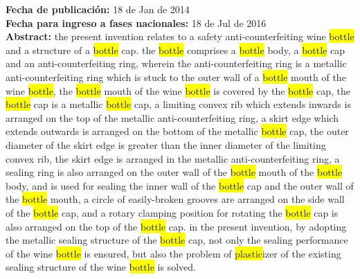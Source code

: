\textbf{Fecha de publicación:} 18 de Jan de 2014\\ 
\textbf{Fecha para ingreso a fases nacionales:} 18 de Jul de 2016\\ 
\textbf{Abstract:} the present invention relates to a safety anti-counterfeiting wine \colorbox{yellow}{bottle} and a structure of a \colorbox{yellow}{bottle} cap. the \colorbox{yellow}{bottle} comprises a \colorbox{yellow}{bottle} body, a \colorbox{yellow}{bottle} cap and an anti-counterfeiting ring, wherein the anti-counterfeiting ring is a metallic anti-counterfeiting ring which is stuck to the outer wall of a \colorbox{yellow}{bottle} mouth of the wine \colorbox{yellow}{bottle}, the \colorbox{yellow}{bottle} mouth of the wine \colorbox{yellow}{bottle} is covered by the \colorbox{yellow}{bottle} cap, the \colorbox{yellow}{bottle} cap is a metallic \colorbox{yellow}{bottle} cap, a limiting convex rib which extends inwards is arranged on the top of the metallic anti-counterfeiting ring, a skirt edge which extends outwards is arranged on the bottom of the metallic \colorbox{yellow}{bottle} cap, the outer diameter of the skirt edge is greater than the inner diameter of the limiting convex rib, the skirt edge is arranged in the metallic anti-counterfeiting ring, a sealing ring is also arranged on the outer wall of the \colorbox{yellow}{bottle} mouth of the \colorbox{yellow}{bottle} body, and is used for sealing the inner wall of the \colorbox{yellow}{bottle} cap and the outer wall of the \colorbox{yellow}{bottle} mouth, a circle of easily-broken grooves are arranged on the side wall of the \colorbox{yellow}{bottle} cap, and a rotary clamping position for rotating the \colorbox{yellow}{bottle} cap is also arranged on the top of the \colorbox{yellow}{bottle} cap. in the present invention, by adopting the metallic sealing structure of the \colorbox{yellow}{bottle} cap, not only the sealing performance of the wine \colorbox{yellow}{bottle} is ensured, but also the problem of \colorbox{yellow}{plastic}izer of the existing sealing structure of the wine \colorbox{yellow}{bottle} is solved.\\ 
 
